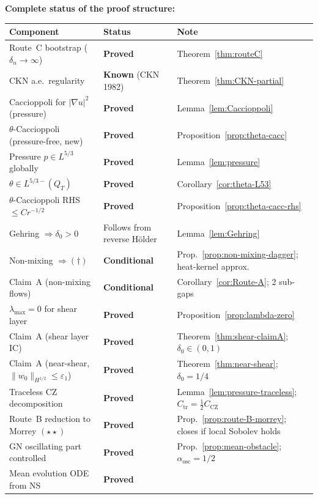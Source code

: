 \documentclass[11pt]{article}
\theoremstyle{definition}
\theoremstyle{remark}
\newcommand{\grad}{\nabla}
\begin{document}
\medskip
\noindent\textbf{Complete status of the proof structure:}
\begin{center}
\begin{tabular}{@{}lll@{}}
\toprule
Component & Status & Note \\
\midrule
Route~C bootstrap ($\delta_n\to\infty$) & \textbf{Proved} &
  Theorem~\ref{thm:routeC} \\
CKN a.e.\ regularity & \textbf{Known} (CKN 1982) &
  Theorem~\ref{thm:CKN-partial} \\
Caccioppoli for $|\grad u|^2$ (pressure) & \textbf{Proved} &
  Lemma~\ref{lem:Caccioppoli} \\
$\theta$-Caccioppoli (pressure-free, new) & \textbf{Proved} &
  Proposition~\ref{prop:theta-cacc} \\
Pressure $p\in L^{5/3}$ globally & \textbf{Proved} &
  Lemma~\ref{lem:pressure} \\
$\theta\in L^{5/3-}(Q_T)$ & \textbf{Proved} &
  Corollary~\ref{cor:theta-L53} \\
$\theta$-Caccioppoli RHS $\leq Cr^{-1/2}$ & \textbf{Proved} &
  Proposition~\ref{prop:theta-cacc-rhs} \\
Gehring $\Rightarrow\delta_0>0$ & Follows from reverse H\"older &
  Lemma~\ref{lem:Gehring} \\
Non-mixing $\Rightarrow(\dagger)$ & \textbf{Conditional} &
  Prop.~\ref{prop:non-mixing-dagger}; heat-kernel approx.\ \\
Claim~A (non-mixing flows) & \textbf{Conditional} &
  Corollary~\ref{cor:Route-A}; 2 sub-gaps \\
$\lambda_{\max}=0$ for shear layer & \textbf{Proved} &
  Proposition~\ref{prop:lambda-zero} \\
Claim~A (shear layer IC) & \textbf{Proved} &
  Theorem~\ref{thm:shear-claimA}; $\delta_0\in(0,1)$ \\
Claim~A (near-shear, $\|w_0\|_{H^{1/2}}\leq\varepsilon_1$) & \textbf{Proved} &
  Theorem~\ref{thm:near-shear}; $\delta_0=1/4$ \\
Traceless CZ decomposition & \textbf{Proved} &
  Lemma~\ref{lem:pressure-traceless}; $C_{\mathrm{tr}}=\tfrac{1}{2}C_{\mathrm{CZ}}$ \\
Route~B reduction to Morrey $(\star\star)$ & \textbf{Proved} &
  Prop.~\ref{prop:route-B-morrey}; closes if local Sobolev holds \\
GN oscillating part controlled & \textbf{Proved} &
  Prop.~\ref{prop:mean-obstacle}; $\alpha_{\mathrm{osc}}=1/2$ \\
Mean evolution ODE from NS & \textbf{Proved} &

\end{tabular}
\end{center}
\end{document}
